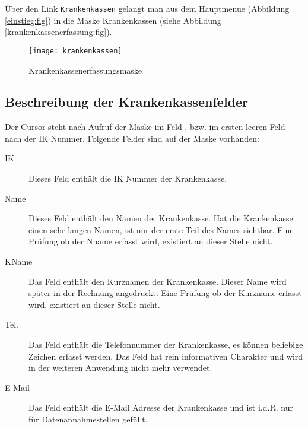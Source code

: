 Über den Link \verb|Krankenkassen| gelangt man aus dem Hauptmenue 
(Abbildung \vref{einstieg:fig}) in die Maske Krankenkassen
(siehe Abbildung \vref{krankenkassenerfassung:fig}).
\begin{figure}[ht]
\centering
\texttt{[image: krankenkassen]}
\caption{Krankenkassenerfassungsmaske\label{krankenkassenerfassung:fig}}
\end{figure}
\subsection{Beschreibung der Krankenkassenfelder}
Der Cursor steht nach Aufruf der Maske im Feld , bzw. im ersten
leeren Feld nach der IK Nummer.
Folgende Felder sind auf der Maske vorhanden:
\begin{description}
\item[IK] 
Dieses Feld enthält die IK Nummer der Krankenkasse.
\item[Name]
Dieses Feld enthält den Namen der Krankenkasse. Hat die Krankenkasse einen
sehr langen Namen, ist nur der erste Teil des Names sichtbar.
Eine Prüfung ob der Nname erfasst wird, existiert an dieser Stelle nicht.
\item[KName] 
Das Feld enthält den Kurznamen der Krankenkasse. Dieser Name wird später
in der Rechnung angedruckt.
Eine Prüfung ob der Kurzname erfasst wird, existiert an dieser Stelle nicht.
\item[Tel.] 
Das Feld enthält die Telefonnummer der Krankenkasse, 
es können beliebige
Zeichen erfasst werden. Das Feld hat rein informativen Charakter 
und wird in der weiteren Anwendung
nicht mehr verwendet.
\item[E-Mail]
Das Feld enthält die E-Mail Adresse der Krankenkasse und ist i.d.R. nur 
für Datenannahmestellen gefüllt.
\end{description}


